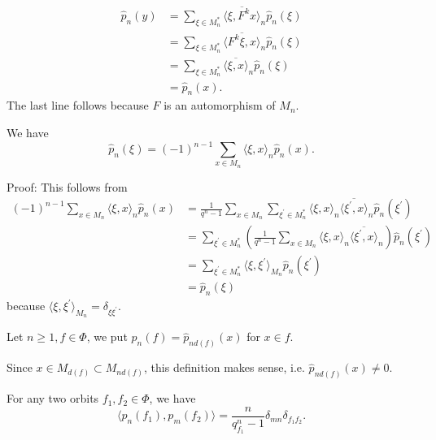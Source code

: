 \begin{equation}
    \begin{split}
        \hat{p}_n(y)&=\sum_{\xi\in M_n^*}\overline{\langle\xi, F^kx\rangle}_n\hat{p}_n(\xi)\\
        &=\sum_{\xi\in M_n^*}\overline{\langle F^k\xi, x\rangle}_n\hat{p}_n(\xi)\\
        &=\sum_{\xi\in M_n^*}\overline{\langle \xi, x\rangle}_n\hat{p}_n(\xi)\\
        &=\hat{p}_n(x).
    \end{split}
\end{equation}
The last line follows because $F$ is an automorphism of $M_n$.
\begin{dang}
    \begin{lemma}\label{Lemma: pn(xi) as a linear combination of pn(x)}
        We have
        \begin{equation}
            \hat{p}_n(\xi)= (-1)^{n-1}\sum_{x\in M_n}\langle\xi,x\rangle_n\hat{p}_n(x).
        \end{equation}
    \end{lemma}
\end{dang}
Proof: This follows from
\begin{equation}\label{Equation: pn(xi)}
\begin{split}
     (-1)^{n-1}\sum_{x\in M_n}\langle\xi,x\rangle_n\hat{p}_n(x) &=\frac{1}{q^n-1}\sum_{x\in M_n}\sum_{\xi^\prime\in M_n^*}\langle\xi,x\rangle_n\overline{\langle\xi^\prime,x\rangle}_n\hat{p}_n(\xi^\prime)\\
     &=\sum_{\xi^\prime\in M_n^*}\left(\frac{1}{q^n-1}\sum_{x\in M_n}\langle\xi,x\rangle_n\overline{\langle\xi^\prime,x\rangle}_n\right)\hat{p}_n(\xi^\prime)\\
     &=\sum_{\xi^\prime\in M_n^*}\langle\xi,\xi^\prime\rangle_{M_n}\hat{p}_n(\xi^\prime)\\
     &=\hat{p}_n(\xi)
\end{split}
\end{equation}
because $\langle\xi,\xi^\prime\rangle_{M_n}=\delta_{\xi\xi^\prime}$.
\begin{dang}
    \begin{definition}\cite{jing2024characters}\label{Definition: pn(f)}
        Let $n\geq1, f\in\Phi$, we put $p_n(f)=\hat{p}_{nd(f)}(x)$ for $x\in f$.  
    \end{definition}
\end{dang}
Since $x\in M_{d(f)}\subset M_{nd(f)}$, this definition makes sense, i.e. $\hat{p}_{nd(f)}(x)\neq0$.
\begin{dang}
    \begin{lemma}\cite{jing2024characters}\label{Lemma: inner product between power sums in f}
        For any two orbits $f_1,f_2\in \Phi$, we have
        \begin{equation}
            \langle p_n(f_1), p_m(f_2)\rangle = \frac{n}{q_{f_1}^n-1}\delta_{mn}\delta_{f_1f_2}.
        \end{equation}
    \end{lemma}
\end{dang} 
